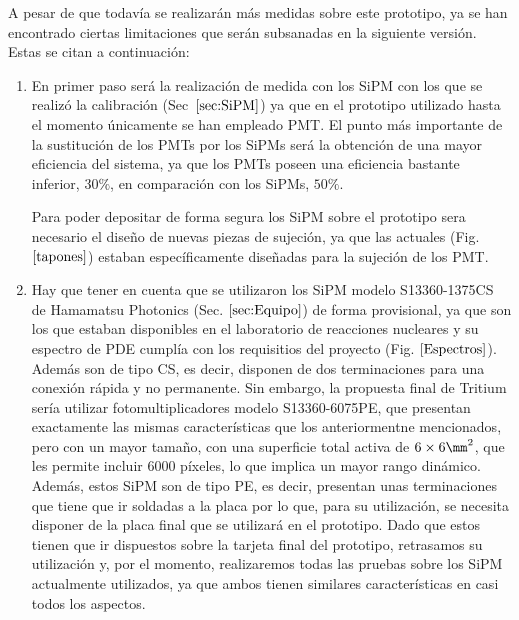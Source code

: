 A pesar de que todavía se realizarán más medidas sobre este prototipo, ya se han encontrado ciertas limitaciones que serán subsanadas  en la siguiente versión. Estas se citan a continuación:
\begin{enumerate}
\item{} En primer paso será la realización de medida con los SiPM con los que se realizó la calibración (Sec~$\ref{sec:SiPM}$) ya que en el prototipo utilizado hasta el momento únicamente se han empleado PMT. El punto más importante de la sustitución de los PMTs por los SiPMs será la obtención de una mayor eficiencia del sistema, ya que los PMTs poseen una eficiencia bastante inferior, $30\%$, en comparación con los SiPMs, $50\%$.

Para poder depositar de forma segura los SiPM sobre el prototipo sera necesario el diseño de nuevas piezas de sujeción, ya que las actuales (Fig. $\ref{tapones}$) estaban específicamente diseñadas para la sujeción de los PMT.

\item{} Hay que tener en cuenta que se utilizaron los SiPM modelo S13360-1375CS de Hamamatsu Photonics (Sec. $\ref{sec:Equipo}$) de forma provisional, ya que son los que estaban disponibles en el laboratorio de reacciones nucleares y su espectro de PDE cumplía con los requisitios del proyecto (Fig. $\ref{Espectros}$). Además son de tipo CS, es decir, disponen de dos terminaciones para una conexión rápida y no permanente. 
Sin embargo, la propuesta final de Tritium sería utilizar fotomultiplicadores modelo S13360-6075PE,  que presentan exactamente las mismas características que los anteriormentne mencionados, pero con un mayor tamaño, con una superficie total activa de $6 \times 6 \mm^2$,  que les permite incluir $6000$ píxeles, lo que  implica un mayor rango dinámico. Además, estos SiPM son de tipo PE, es decir, presentan unas terminaciones que tiene que ir soldadas a la placa por lo que, para su utilización, se necesita disponer de la placa final que se utilizará en el prototipo. 
Dado que estos tienen que ir dispuestos sobre la tarjeta final del prototipo, retrasamos su utilización y, por el momento, realizaremos todas las pruebas sobre los SiPM actualmente utilizados, ya que ambos tienen similares características en casi todos los aspectos.


\end{enumerate}
